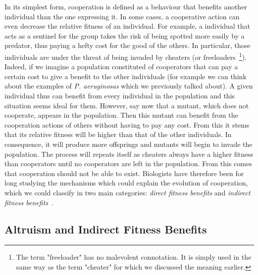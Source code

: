     In its simplest form, cooperation is defined as a behaviour that benefits another individual than the one expressing it. In some cases, a cooperative action can even decrease the relative fitness of an individual. For example, a individual that acts as a sentinel for the group takes the risk of being spotted more easily by a predator, thus paying a hefty cost for the good of the others. In particular, those individuals are under the threat of being invaded by cheaters (or freeloaders~\footnote{The term "freeloader" has no malevolent connotation. It is simply used in the same way as the term "cheater" for which we discussed the meaning earlier.}). Indeed, if we imagine a population constituted of cooperators that can pay a certain cost to give a benefit to the other individuals (for example we can think about the examples of \emph{P. aeruginosas} which we previously talked about). A given individual thus can benefit from every individual in the population and this situation seems ideal for them. However, say now that a mutant, which does not cooperate, appears in the population. Then this mutant can benefit from the cooperation actions of others without having to pay any cost. From this it stems that its relative fitness will be higher than that of the other individuals. In consequence, it will produce more offsprings and mutants will begin to invade the population. The process will repeats itself as cheaters always have a higher fitness than cooperators until no cooperators are left in the population. From this comes that cooperation should not be able to exist. Biologists have therefore been for long studying the mechanisms which could explain the evolution of cooperation, which we could classify in two main categories: \emph{direct fitness benefits} and \emph{indirect fitness benefits}~\parencite{West2007a}.

  \subsection{Altruism and Indirect Fitness Benefits}

